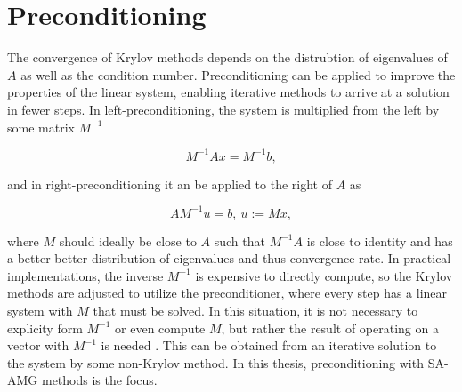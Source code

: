 
\section{Preconditioning}

The convergence of Krylov methods depends on the distrubtion of eigenvalues of $A$ as well as the condition number. Preconditioning can be applied to improve the properties of the linear system, enabling iterative methods to arrive at a solution in fewer steps. In left-preconditioning, the system is multiplied from the left by some matrix $M^{-1}$

\begin{equation}
    M^{-1}Ax = M^{-1}b,
\end{equation}

and in right-preconditioning it an be applied to the right of $A$ as

\begin{equation}
    A M^{-1} u = b,\ u:= Mx,
\end{equation}

where $M$ should ideally be close to $A$ such that $M^{-1}A$ is close to identity and has a better better distribution of eigenvalues and thus convergence rate. In practical implementations, the inverse $M^{-1}$ is expensive to directly compute, so the Krylov methods are adjusted to utilize the preconditioner, where every step has a linear system with $M$ that must be solved. In this situation, it is not necessary to explicity form $M^{-1}$ or even compute $M$, but rather the result of operating on a vector with $M^{-1}$ is needed \cite{Shewchuk1994}. This can be obtained from an iterative solution to the system by some non-Krylov method. In this thesis, preconditioning with SA-AMG methods is the focus.

